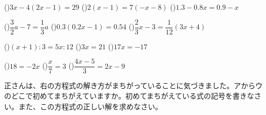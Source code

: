 \documentclass[
  12pt,a4paper,lualatex,ja=standard]{bxjsarticle}
\begin{document}
\begin{flushleft}
\newpage

()\hspace{2.5pt}$3x - 4(2x - 1) = 29$ \hfill ()\hspace{2.5pt}$2(x - 1) = 7(- x - 8)$ \hfill ()\hspace{2.5pt}$1.3 - 0.8x = 0.9 - x$ 

\vspace{30mm}

()\hspace{2.5pt}$\dfrac{3}{2}a - 7 = \dfrac{1}{3}a$ \hfill ()\hspace{2.5pt}$0.3(0.2x - 1) = 0.54$ \hfill ()\hspace{2.5pt}$\dfrac{2}{3}x -3 = \dfrac{1}{12}(3x + 4)$

\vspace{30mm}

()\hspace{2.5pt}$(x + 1):3 = 5x :12$ \hfill ()\hspace{2.5pt}$3x = 21$ \hfill ()\hspace{2.5pt}$17x = -17$ 

\vspace{30mm}

()\hspace{2.5pt}$18 = -2x$ \hfill ()\hspace{2.5pt}$\dfrac{x}{7} = 3$ \hfill ()\hspace{2.5pt}$\dfrac{4x -5}{3} = 2x - 9$

\vspace{30mm}

\newpage

\begin{multicols}{2}
\noindent{} \hspace{1pt}
正さんは、右の方程式の解き方がまちがっていることに気づきました。アからウのどこで$\underline{\mbox{初めてまちがえていますか}}$。初めてまちがえている式の記号を書きなさい。また、この方程式の正しい解を求めなさい。


\end{multicols}
\end{flushleft}
\end{document}
